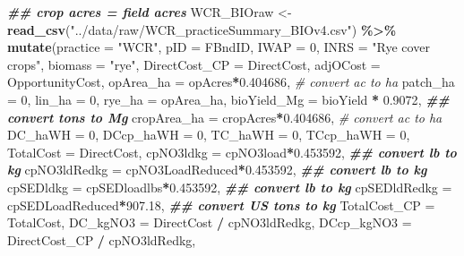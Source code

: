 \documentclass[
]{article}
\newenvironment{Shaded}{\begin{snugshade}}{\end{snugshade}}
\newcommand{\AttributeTok}[1]{\textcolor[rgb]{0.13,0.29,0.53}{#1}}
\newcommand{\CommentTok}[1]{\textcolor[rgb]{0.56,0.35,0.01}{\textit{#1}}}
\newcommand{\DecValTok}[1]{\textcolor[rgb]{0.00,0.00,0.81}{#1}}
\newcommand{\DocumentationTok}[1]{\textcolor[rgb]{0.56,0.35,0.01}{\textbf{\textit{#1}}}}
\newcommand{\FloatTok}[1]{\textcolor[rgb]{0.00,0.00,0.81}{#1}}
\newcommand{\FunctionTok}[1]{\textcolor[rgb]{0.13,0.29,0.53}{\textbf{#1}}}
\newcommand{\NormalTok}[1]{#1}
\newcommand{\OtherTok}[1]{\textcolor[rgb]{0.56,0.35,0.01}{#1}}
\newcommand{\SpecialCharTok}[1]{\textcolor[rgb]{0.81,0.36,0.00}{\textbf{#1}}}
\newcommand{\StringTok}[1]{\textcolor[rgb]{0.31,0.60,0.02}{#1}}
\begin{document}
\begin{Shaded}
\begin{Highlighting}[]
\DocumentationTok{\#\# crop acres = field acres}
\NormalTok{WCR\_BIOraw }\OtherTok{\textless{}{-}} \FunctionTok{read\_csv}\NormalTok{(}\StringTok{"../data/raw/WCR\_practiceSummary\_BIOv4.csv"}\NormalTok{) }\SpecialCharTok{\%\textgreater{}\%}
  \FunctionTok{mutate}\NormalTok{(}\AttributeTok{practice =} \StringTok{"WCR"}\NormalTok{,}
         \AttributeTok{pID =}\NormalTok{ FBndID,}
         \AttributeTok{IWAP =} \DecValTok{0}\NormalTok{,}
         \AttributeTok{INRS =} \StringTok{"Rye cover crops"}\NormalTok{,}
         \AttributeTok{biomass =} \StringTok{"rye"}\NormalTok{,}
         \AttributeTok{DirectCost\_CP =}\NormalTok{ DirectCost,}
         \AttributeTok{adjOCost =}\NormalTok{ OpportunityCost,}
         \AttributeTok{opArea\_ha =}\NormalTok{ opAcres}\SpecialCharTok{*}\FloatTok{0.404686}\NormalTok{, }\CommentTok{\# convert ac to ha}
         \AttributeTok{patch\_ha =} \DecValTok{0}\NormalTok{,}
         \AttributeTok{lin\_ha =} \DecValTok{0}\NormalTok{,}
         \AttributeTok{rye\_ha =}\NormalTok{ opArea\_ha,}
         \AttributeTok{bioYield\_Mg =}\NormalTok{ bioYield }\SpecialCharTok{*} \FloatTok{0.9072}\NormalTok{, }\DocumentationTok{\#\# convert tons to Mg}
         \AttributeTok{cropArea\_ha =}\NormalTok{ cropAcres}\SpecialCharTok{*}\FloatTok{0.404686}\NormalTok{, }\CommentTok{\# convert ac to ha}
         \AttributeTok{DC\_haWH =} \DecValTok{0}\NormalTok{,}
         \AttributeTok{DCcp\_haWH =} \DecValTok{0}\NormalTok{,}
         \AttributeTok{TC\_haWH =} \DecValTok{0}\NormalTok{,}
         \AttributeTok{TCcp\_haWH =} \DecValTok{0}\NormalTok{,}
         \AttributeTok{TotalCost =}\NormalTok{ DirectCost,}
         \AttributeTok{cpNO3ldkg =}\NormalTok{ cpNO3load}\SpecialCharTok{*}\FloatTok{0.453592}\NormalTok{, }\DocumentationTok{\#\# convert lb to kg}
         \AttributeTok{cpNO3ldRedkg =}\NormalTok{ cpNO3LoadReduced}\SpecialCharTok{*}\FloatTok{0.453592}\NormalTok{, }\DocumentationTok{\#\# convert lb to kg}
         \AttributeTok{cpSEDldkg =}\NormalTok{ cpSEDloadlbs}\SpecialCharTok{*}\FloatTok{0.453592}\NormalTok{, }\DocumentationTok{\#\# convert lb to kg}
         \AttributeTok{cpSEDldRedkg =}\NormalTok{ cpSEDLoadReduced}\SpecialCharTok{*}\FloatTok{907.18}\NormalTok{, }\DocumentationTok{\#\# convert US tons to kg}
         \AttributeTok{TotalCost\_CP =}\NormalTok{ TotalCost,}
         \AttributeTok{DC\_kgNO3 =}\NormalTok{ DirectCost }\SpecialCharTok{/}\NormalTok{ cpNO3ldRedkg,}
         \AttributeTok{DCcp\_kgNO3 =}\NormalTok{ DirectCost\_CP }\SpecialCharTok{/}\NormalTok{ cpNO3ldRedkg,}

\end{Highlighting}
\end{Shaded}
\end{document}
